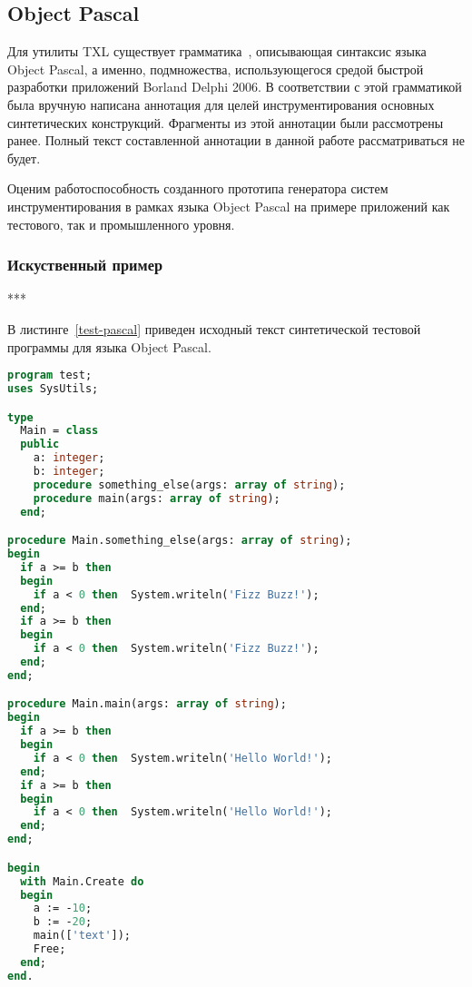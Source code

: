 \subsection{Object Pascal}

Для утилиты TXL существует грамматика~\cite{txl-resources}, описывающая синтаксис языка Object Pascal, а именно, подмножества, использующегося средой быстрой разработки приложений Borland Delphi 2006.
В соответствии с этой грамматикой была вручную написана аннотация для целей инструментирования основных синтетических конструкций.
Фрагменты из этой аннотации были рассмотрены ранее.
Полный текст составленной аннотации в данной работе рассматриваться не будет.

Оценим работоспособность созданного прототипа генератора систем инструментирования в рамках языка Object Pascal на примере приложений как тестового, так и промышленного уровня.

\subsubsection{Искуственный пример}

***

В листинге~\ref{test-pascal} приведен исходный текст синтетической тестовой программы для языка Object Pascal.

\begin{lstlisting}[frame=single, language=Pascal, label={test-pascal}, caption={Исходный текст тестового приложения.}]
program test;
uses SysUtils;

type
  Main = class
  public
    a: integer;
    b: integer;
    procedure something_else(args: array of string);
    procedure main(args: array of string);
  end;

procedure Main.something_else(args: array of string);
begin
  if a >= b then
  begin
    if a < 0 then  System.writeln('Fizz Buzz!');
  end;
  if a >= b then
  begin
    if a < 0 then  System.writeln('Fizz Buzz!');
  end;
end;

procedure Main.main(args: array of string);
begin
  if a >= b then
  begin
    if a < 0 then  System.writeln('Hello World!');
  end;
  if a >= b then
  begin
    if a < 0 then  System.writeln('Hello World!');
  end;
end;

begin
  with Main.Create do
  begin
    a := -10;
    b := -20;
    main(['text']);
    Free;
  end;
end.
\end{lstlisting}

